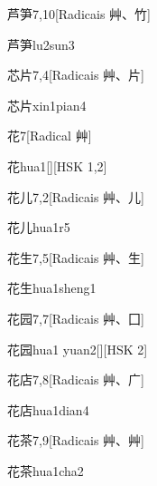 \begin{entry}{芦笋}{7,10}[Radicais ⾋、⽵]
  \begin{phonetics}{芦笋}{lu2sun3}
  \end{phonetics}
\end{entry}

\begin{entry}{芯片}{7,4}[Radicais ⾋、⽚]
  \begin{phonetics}{芯片}{xin1pian4}
  \end{phonetics}
\end{entry}

\begin{entry}{花}{7}[Radical ⾋]
  \begin{phonetics}{花}{hua1}[][HSK 1,2]
  \end{phonetics}
\end{entry}

\begin{entry}{花儿}{7,2}[Radicais ⾋、⼉]
  \begin{phonetics}{花儿}{hua1r5}
  \end{phonetics}
\end{entry}

\begin{entry}{花生}{7,5}[Radicais ⾋、⽣]
  \begin{phonetics}{花生}{hua1sheng1}
  \end{phonetics}
\end{entry}

\begin{entry}{花园}{7,7}[Radicais ⾋、⼞]
  \begin{phonetics}{花园}{hua1 yuan2}[][HSK 2]
  \end{phonetics}
\end{entry}

\begin{entry}{花店}{7,8}[Radicais ⾋、⼴]
  \begin{phonetics}{花店}{hua1dian4}
  \end{phonetics}
\end{entry}

\begin{entry}{花茶}{7,9}[Radicais ⾋、⾋]
  \begin{phonetics}{花茶}{hua1cha2}
  \end{phonetics}
\end{entry}

